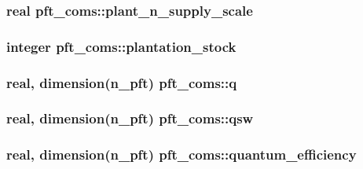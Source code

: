 \subsubsection[{\texorpdfstring{plant\+\_\+n\+\_\+supply\+\_\+scale}{plant_n_supply_scale}}]{\setlength{\rightskip}{0pt plus 5cm}real pft\+\_\+coms\+::plant\+\_\+n\+\_\+supply\+\_\+scale}\hypertarget{namespacepft__coms_a519f5d42172d290ddad951a2744c5a20}{}\label{namespacepft__coms_a519f5d42172d290ddad951a2744c5a20}
\subsubsection[{\texorpdfstring{plantation\+\_\+stock}{plantation_stock}}]{\setlength{\rightskip}{0pt plus 5cm}integer pft\+\_\+coms\+::plantation\+\_\+stock}\hypertarget{namespacepft__coms_abade08057c8846615ec5ff4ff9d3ffa2}{}\label{namespacepft__coms_abade08057c8846615ec5ff4ff9d3ffa2}
\subsubsection[{\texorpdfstring{q}{q}}]{\setlength{\rightskip}{0pt plus 5cm}real, dimension(n\+\_\+pft) pft\+\_\+coms\+::q}\hypertarget{namespacepft__coms_a94feb354a8416167ef0ff2690843ebcd}{}\label{namespacepft__coms_a94feb354a8416167ef0ff2690843ebcd}
\subsubsection[{\texorpdfstring{qsw}{qsw}}]{\setlength{\rightskip}{0pt plus 5cm}real, dimension(n\+\_\+pft) pft\+\_\+coms\+::qsw}\hypertarget{namespacepft__coms_a646ad26118949294d5b8007435e7d33d}{}\label{namespacepft__coms_a646ad26118949294d5b8007435e7d33d}
\subsubsection[{\texorpdfstring{quantum\+\_\+efficiency}{quantum_efficiency}}]{\setlength{\rightskip}{0pt plus 5cm}real, dimension(n\+\_\+pft) pft\+\_\+coms\+::quantum\+\_\+efficiency}\hypertarget{namespacepft__coms_ad1cdaf379a14e627f176105d6d744edb}{}\label{namespacepft__coms_ad1cdaf379a14e627f176105d6d744edb}
